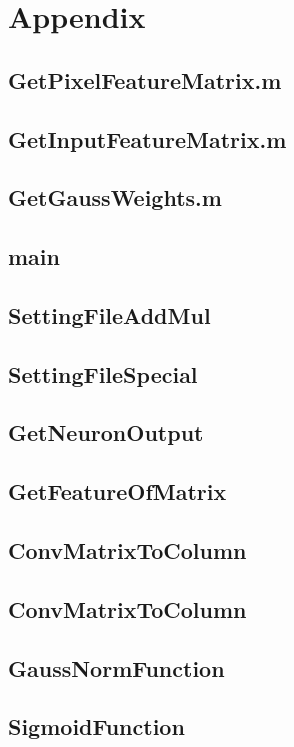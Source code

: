 \newpage
\section{Appendix}\label{Appendix}
\subsection{GetPixelFeatureMatrix.m}\label{GetPixelFeatureMatrix}

\subsection{GetInputFeatureMatrix.m}\label{GetInputFeatureMatrix}

\subsection{GetGaussWeights.m}\label{GetGaussWeights}

\subsection{main}\label{main}

\subsection{SettingFileAddMul}\label{SettingFileAddMul}

\subsection{SettingFileSpecial}\label{SettingFileSpecial}

\subsection{GetNeuronOutput}\label{GetNeuronOutput}

\subsection{GetFeatureOfMatrix}\label{GetFeatureOfMatrix}

\subsection{ConvMatrixToColumn}\label{ConvMatrixToColumn}
\subsection{ConvMatrixToColumn}\label{ConvMatrixToColumn}
\subsection{GaussNormFunction}\label{GaussNormFunction}

\subsection{SigmoidFunction}\label{SigmoidFunction}
